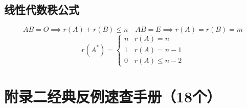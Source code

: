 \documentclass[12pt,a4paper]{ctexbook}
\begin{document}
\section*{线性代数秩公式}
\[
AB=O\implies r(A)+r(B)\leqslant n\quad AB=E\implies r(A)=r(B)=m
\]
\[
r(A^*)=\begin{cases}n & r(A)=n\\ 1 & r(A)=n-1\\ 0 & r(A)\leqslant n-2\end{cases}
\]

\newpage

\chapter*{附录二\quad 经典反例速查手册（18个）}
\end{document}
